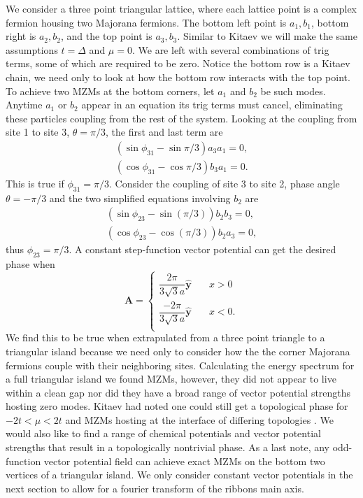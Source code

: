 \documentclass[aps,prb,showpacs,amsmath,amssymb,superscriptaddress]{revtex4-2}
\let\oldhat\hat
\renewcommand{\hat}[1]{\oldhat{\mathbf{#1}}}
\renewcommand{\vec}[1]{\mathbf{#1}}
\newcommand{\de}{\Delta}
\begin{document}
We consider a three point triangular lattice, where each lattice point is a complex fermion housing two Majorana fermions.
The bottom left point is $a_1, b_1$, bottom right is $a_2, b_2$, and the top point is $a_3, b_3$.
Similar to Kitaev we will make the same assumptions $t=\de$ and $\mu=0$.
We are left with several combinations of trig terms, some of which are required to be zero.
Notice the bottom row is a Kitaev chain, we need only to look at how the bottom row interacts with the top point.
To achieve two MZMs at the bottom corners, let $a_1$ and $b_2$ be such modes.
Anytime $a_1$ or $b_2$ appear in an equation its trig terms must cancel, eliminating these particles coupling from the rest of the system.
Looking at the coupling from site 1 to site 3, $\theta = \pi/3$, the first and last term are
\begin{align}
  (\sin\phi_{31} - \sin\pi/3) a_3 a_1 = 0, \\
  (\cos\phi_{31} - \cos\pi/3) b_3 a_1 = 0.
\end{align}
This is true if $\phi_{31} = \pi/3$.
Consider the coupling of site 3 to site 2, phase angle $\theta = -\pi/3$ and the two simplified equations involving $b_2$ are
\begin{align}
  (\sin\phi_{23} - \sin(\pi/3)) b_2 b_3 = 0, \nonumber \\
  (\cos\phi_{23} - \cos(\pi/3)) b_2 a_3 = 0, \nonumber
\end{align}
thus $\phi_{23} = \pi/3$.
A constant step-function vector potential can get the desired phase when
\begin{equation}
  \vec{A} = \begin{cases}
      \dfrac{2 \pi}{3\sqrt{3}a} \hat{y} \quad &x > 0 \\
      \dfrac{-2 \pi}{3\sqrt{3}a} \hat{y} \quad &x < 0. \\
            \end{cases}
\end{equation}
We find this to be true when extrapulated from a three point triangle to a triangular island because we need only to consider how the the corner Majorana fermions couple with their neighboring sites.
Calculating the energy spectrum for a full triangular island we found MZMs, however, they did not appear to live within a clean gap nor did they have a broad range of vector potential strengths hosting zero modes.
Kitaev had noted one could still get a topological phase for $-2t<\mu<2t$ and MZMs hosting at the interface of differing topologies \cite{kitaevUnpairedMajoranaFermions2001}.
We would also like to find a range of chemical potentials and vector potential strengths that result in a topologically nontrivial phase.
As a last note, any odd-function vector potential field can achieve exact MZMs on the bottom two vertices of a triangular island.
We only consider constant vector potentials in the next section to allow for a fourier transform of the ribbons main axis.
\end{document}

